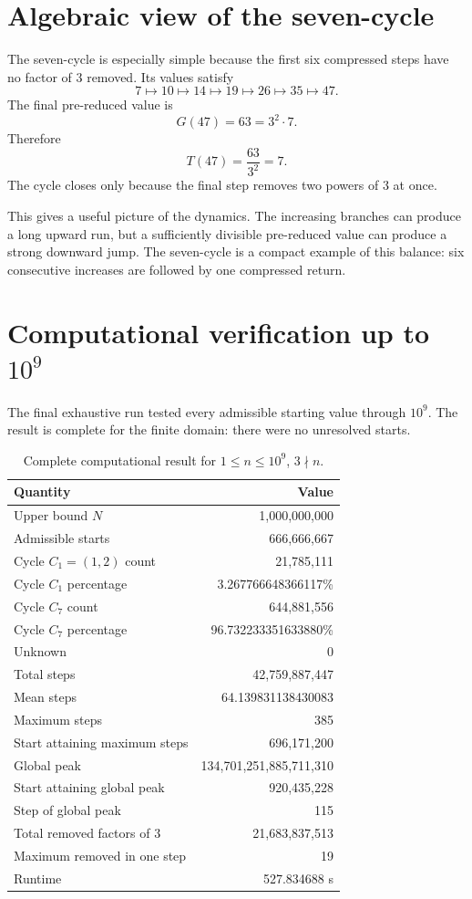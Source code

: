 \documentclass[11pt]{article}
\begin{document}
\section{Algebraic view of the seven-cycle}
The seven-cycle is especially simple because the first six compressed steps have no factor of $3$ removed. Its values satisfy
\[
7\mapsto10\mapsto14\mapsto19\mapsto26\mapsto35\mapsto47.
\]
The final pre-reduced value is
\[
G(47)=63=3^2\cdot7.
\]
Therefore
\[
T(47)=\frac{63}{3^2}=7.
\]
The cycle closes only because the final step removes two powers of $3$ at once.

This gives a useful picture of the dynamics. The increasing branches can produce a long upward run, but a sufficiently divisible pre-reduced value can produce a strong downward jump. The seven-cycle is a compact example of this balance: six consecutive increases are followed by one compressed return.

\section{Computational verification up to $10^9$}
The final exhaustive run tested every admissible starting value through $10^9$. The result is complete for the finite domain: there were no unresolved starts.

\begin{table}[h]
\centering
\caption{Complete computational result for $1\le n\le10^9$, $3\nmid n$.}
\begin{tabular}{lr}
\toprule
Quantity & Value\\
\midrule
Upper bound $N$ & 1,000,000,000\\
Admissible starts & 666,666,667\\
Cycle $C_1=(1,2)$ count & 21,785,111\\
Cycle $C_1$ percentage & 3.267766648366117\%\\
Cycle $C_7$ count & 644,881,556\\
Cycle $C_7$ percentage & 96.732233351633880\%\\
Unknown & 0\\
Total steps & 42,759,887,447\\
Mean steps & 64.139831138430083\\
Maximum steps & 385\\
Start attaining maximum steps & 696,171,200\\
Global peak & 134,701,251,885,711,310\\
Start attaining global peak & 920,435,228\\
Step of global peak & 115\\
Total removed factors of $3$ & 21,683,837,513\\
Maximum removed in one step & 19\\
Runtime & 527.834688 s\\
\bottomrule
\end{tabular}
\end{table}
\end{document}
